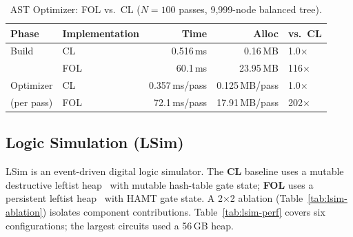 \documentclass[sigconf,nonacm]{acmart}
\begin{document}
\begin{table}[htbp]
\small
\caption{AST Optimizer: FOL vs.\ CL ($N=100$ passes, 9{,}999-node balanced tree).}
\label{tab:ast-bench}
\begin{tabular}{llrrl}
\toprule
\textbf{Phase} & \textbf{Implementation} & \textbf{Time} & \textbf{Alloc} & \textbf{vs.\ CL} \\
\midrule
Build      & CL  &  0.516\,ms &  0.16\,MB & 1.0$\times$ \\
           & FOL & 60.1\,ms  & 23.95\,MB  & 116$\times$ \\
\midrule
Optimizer  & CL  &  0.357\,ms/pass &  0.125\,MB/pass & 1.0$\times$ \\
(per pass) & FOL & 72.1\,ms/pass  &  17.91\,MB/pass & 202$\times$ \\
\bottomrule
\end{tabular}
\end{table}

\subsection{Logic Simulation (LSim)}
\label{sec:simbench}
LSim is an event-driven digital logic simulator.
The \textbf{CL} baseline uses a mutable destructive leftist heap~\cite{Crane1972} with mutable hash-table gate state; \textbf{FOL} uses a persistent leftist heap~\cite{Okasaki1998} with HAMT gate state.
A 2$\times$2 ablation (Table~\ref{tab:lsim-ablation}) isolates component contributions.
Table~\ref{tab:lsim-perf} covers six configurations; the largest circuits used a 56\,GB heap.
\end{document}

